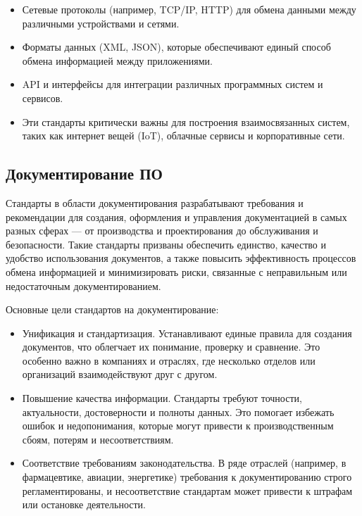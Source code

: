 \begin{itemize}
	\item Сетевые протоколы (например, TCP/IP, HTTP)
		для обмена данными между различными устройствами и сетями.
	\item Форматы данных (XML, JSON),
		которые обеспечивают единый способ обмена информацией
		между приложениями.
	\item API и интерфейсы для интеграции различных программных систем
		и сервисов.
	\item Эти стандарты критически важны для построения взаимосвязанных систем,
		таких как интернет вещей (IoT), облачные сервисы и корпоративные сети.
\end{itemize}

\subsection{Документирование ПО}

Стандарты в области документирования разрабатывают требования
и рекомендации для создания, оформления
и управления документацией в самых разных сферах --- от производства
и проектирования до обслуживания и безопасности.
Такие стандарты призваны обеспечить единство,
качество и удобство использования документов,
а также повысить эффективность процессов обмена информацией
и минимизировать риски,
связанные с неправильным или недостаточным документированием.

Основные цели стандартов на документирование:

\begin{itemize}
	\item Унификация и стандартизация.
		Устанавливают единые правила для создания документов,
		что облегчает их понимание, проверку и сравнение.
		Это особенно важно в компаниях и отраслях,
		где несколько отделов или организаций взаимодействуют друг с другом.
	\item Повышение качества информации.
		Стандарты требуют точности, актуальности,
		достоверности и полноты данных.
		Это помогает избежать ошибок и недопонимания,
		которые могут привести к производственным сбоям,
		потерям и несоответствиям.
	\item Соответствие требованиям законодательства.
		В ряде отраслей (например, в фармацевтике, авиации, энергетике)
		требования к документированию строго регламентированы,
		и несоответствие стандартам может привести к штрафам
		или остановке деятельности.
\end{itemize}

